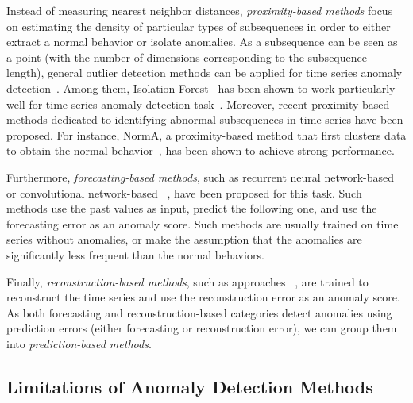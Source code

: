 Instead of measuring nearest neighbor distances, \textit{proximity-based methods} focus on estimating the density of particular types of subsequences in order to either extract a normal behavior or isolate anomalies. As a subsequence can be seen as a  point (with the number of dimensions corresponding to the subsequence length), general outlier detection methods can be applied for time series anomaly detection~\cite{liu_isolation_2008,Breunig:2000:LID:342009.335388,ma2020isolation}. Among them, Isolation Forest~\cite{liu_isolation_2008} has been shown to work particularly well for time series anomaly detection task~\cite{Series2GraphPaper}. Moreover, recent proximity-based methods dedicated to identifying abnormal subsequences in time series have been proposed. For instance, NormA, a proximity-based method that first clusters data to obtain the normal behavior~\cite{norm, boniol_unsupervised_2021, DBLP:conf/icde/BoniolLRP20, boniol2021sand, boniol2021sanddemo}, %
has been shown to achieve strong performance.

Furthermore, \textit{forecasting-based methods}, such as recurrent neural network-based ~\cite{malhotra_long_2015} or convolutional network-based ~\cite{8581424}, have been proposed for this task. Such methods use the past values as input, predict the following one, and use the forecasting error as an anomaly score. Such methods are usually trained on time series without anomalies, or make the assumption that the anomalies are significantly less frequent than the normal behaviors.

Finally, \textit{reconstruction-based methods}, such as  approaches ~\cite{10.1145/2689746.2689747}, are trained to reconstruct the time series and use the reconstruction error as an anomaly score. As both forecasting and reconstruction-based categories detect anomalies using prediction errors (either forecasting or reconstruction error), we can group them into \textit{prediction-based methods}. 

\vspace{-0.2cm}
\subsection{Limitations of Anomaly Detection Methods} %
\label{sec:limitation}

